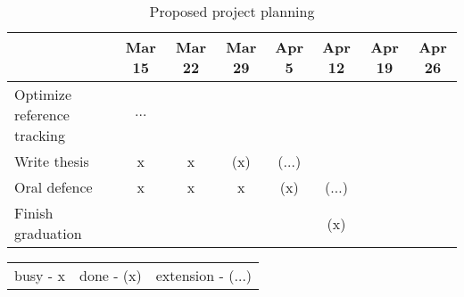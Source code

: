 \begin{table}[H]
\begin{tabular}{p{5cm}ccccccc}
                               & Mar 15 & Mar 22 & Mar 29 & Apr 5  & Apr 12 & Apr 19 & Apr 26 \\ \hline
    Optimize reference tracking     & $\dots$    &           &          &       &   &        &   \\ 
    Write thesis               & x   &    x     &   (x)   & ($\dots$)  &        &        &          \\ 
    Oral defence               &  x    &    x   &   x        & (x)   & ($\dots$)    &        &           \\    
    Finish graduation          &      &        &         &           &   (x)     &        &      \\    \hline 

 
    \end{tabular}
    \caption{Proposed project planning}
    \label{tab1:projectplanning}
\end{table}

\begin{table}[H]
    \centering
    \begin{tabular}{ccc}
       busy - x & done - (x) & extension - ($\dots$)
    \end{tabular}
\end{table}


